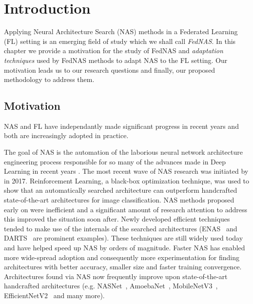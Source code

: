 \chapter{Introduction}\label{chapter:introduction}

Applying Neural Architecture Search (NAS) methods in a Federated Learning (FL) setting is an emerging field of study which we shall call \textit{FedNAS}. In this chapter we provide a motivation for the study of FedNAS and \textit{adaptation techniques} used by FedNAS methods to adapt NAS to the FL setting. Our motivation leads us to our research questions and finally, our proposed methodology to address them.

\section{Motivation}

NAS and FL have independantly made significant progress in recent years and both are increasingly adopted in practice. 

The goal of NAS is the automation of the laborious neural network architecture engineering process responsible for so many of the advances made in Deep Learning in recent years \cite{nas_survey_2019}. The most recent wave of NAS research was initiated by \cite{nas_with_rl_2017} in 2017. Reinforcement Learning, a black-box optimization technique, was used to show that an automatically searched architecture can outperform handcrafted state-of-the-art architectures for image classification. NAS methods proposed early on were inefficient and a significant amount of research attention to address this improved the situation soon after. Newly developed efficient techniques tended to make use of the internals of the searched architectures (ENAS~\cite{enas_2018} and DARTS~\cite{darts_2019} are prominent examples). These techniques are still widely used today and have helped speed up NAS by orders of magnitude. Faster NAS has enabled more wide-spread adoption and consequently more experimentation for finding architectures with better accuracy, smaller size and faster training convergence. Architectures found via NAS now frequently improve upon state-of-the-art handcrafted architectures (e.g. NASNet~\cite{nasnet_2018}, AmoebaNet~\cite{amoebanet_2019}, MobileNetV3~\cite{mobilenetv3_2019}, EfficientNetV2~\cite{efficientnetv2_2021} and many more).

